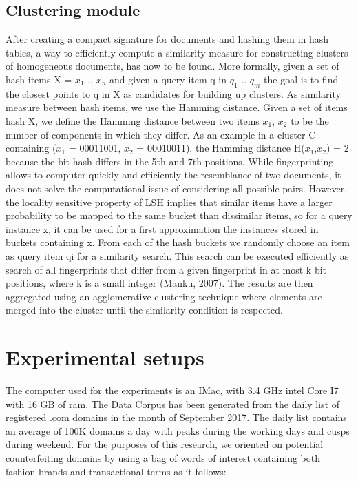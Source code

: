 \documentclass{easychair}
\begin{document}
\subsection{Clustering module}
\label{sect:Clustering module}

After creating a compact signature for documents and hashing them in hash tables, a way to efficiently compute a similarity measure for constructing clusters of homogeneous documents, has now to be found. 
More formally, given a set of hash items X = { $x_1$  .. $x_n$} and given a query item q in {$q_1$ .. $q_m$ } the goal is to find the closest points to q in X  as candidates for building up clusters. As similarity measure between hash items, we use the Hamming distance. Given a set of items hash X, we define the Hamming distance between two items $x_1$, $x_2$ to be the number of components in which they differ. As an example in a cluster C containing ($x_1$ = 00011001, $x_2$ = 00010011), the Hamming distance H($x_1$,$x_2$) = 2 because the bit-hash differs in the 5th and 7th positions. 
While fingerprinting allows to computer quickly and efficiently the resemblance of two documents, it does not solve the computational issue of considering all possible pairs. However, the locality sensitive property of LSH implies that similar items have a larger probability to be mapped to the same bucket than dissimilar items, so for a query instance x, it can be used for a first approximation the instances stored in buckets containing x. From each of the hash buckets we randomly choose an item as query item qi for a similarity search. 
This search can be executed efficiently as search of all fingerprints that differ from a given fingerprint in at most k bit positions, where k is a small integer (Manku, 2007). The results are then aggregated using an agglomerative clustering technique where elements are merged into the cluster until the similarity condition is respected.

\section{Experimental setups}
\label{sect:Experimental setups}

The computer used for the experiments is an IMac, with 3.4 GHz intel Core I7 with 16 GB of ram. The Data Corpus has been generated from the daily list of registered .com domains in the month of September 2017. The daily list contains an average of 100K domains a day with peaks during the working days and cusps during weekend. 
For the purposes of this research, we oriented on potential counterfeiting domains by using a bag of words of interest containing both fashion brands and transactional terms as it follows:\\
\end{document}
